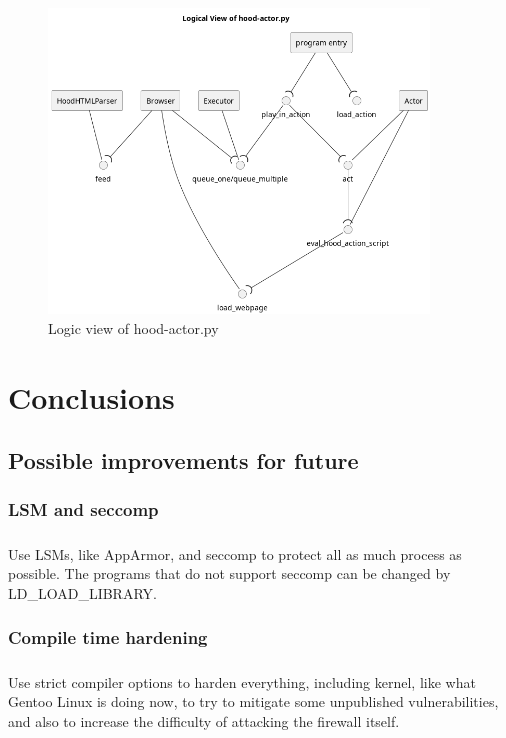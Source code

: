\documentclass[mscthesis]{usiinfthesis}
\begin{document}
\begin{figure}[H]
  \includegraphics[width=0.9\textwidth]{graphics/puml/actor.png}
  \caption{Logic view of hood-actor.py}
  \label{fig:actor-logic-view}
\end{figure}
\paragraph{}

\chapter{Conclusions}

\section{Possible improvements for future}
\subsection{LSM and seccomp}
\paragraph{}
Use LSMs, like AppArmor, and seccomp to protect all as much process as possible. The programs that do not support seccomp can be changed by LD\_LOAD\_LIBRARY.

\subsection{Compile time hardening}
\paragraph{}
Use strict compiler options to harden everything, including kernel, like what Gentoo Linux is doing now, to try to mitigate some unpublished vulnerabilities, and also to increase the difficulty of attacking the firewall itself.
\end{document}
